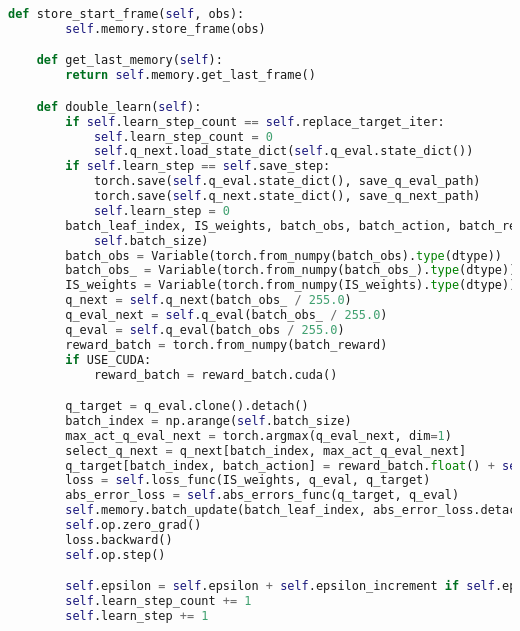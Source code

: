 \begin{lstlisting}[language={python}]
    def store_start_frame(self, obs):
        self.memory.store_frame(obs)

    def get_last_memory(self):
        return self.memory.get_last_frame()

    def double_learn(self):
        if self.learn_step_count == self.replace_target_iter:
            self.learn_step_count = 0
            self.q_next.load_state_dict(self.q_eval.state_dict())
        if self.learn_step == self.save_step:
            torch.save(self.q_eval.state_dict(), save_q_eval_path)
            torch.save(self.q_next.state_dict(), save_q_next_path)
            self.learn_step = 0
        batch_leaf_index, IS_weights, batch_obs, batch_action, batch_reward, batch_obs_ = self.memory.get_memory(
            self.batch_size)
        batch_obs = Variable(torch.from_numpy(batch_obs).type(dtype))
        batch_obs_ = Variable(torch.from_numpy(batch_obs_).type(dtype))
        IS_weights = Variable(torch.from_numpy(IS_weights).type(dtype))
        q_next = self.q_next(batch_obs_ / 255.0)
        q_eval_next = self.q_eval(batch_obs_ / 255.0)
        q_eval = self.q_eval(batch_obs / 255.0)
        reward_batch = torch.from_numpy(batch_reward)
        if USE_CUDA:
            reward_batch = reward_batch.cuda()

        q_target = q_eval.clone().detach()
        batch_index = np.arange(self.batch_size)
        max_act_q_eval_next = torch.argmax(q_eval_next, dim=1)
        select_q_next = q_next[batch_index, max_act_q_eval_next]
        q_target[batch_index, batch_action] = reward_batch.float() + self.gamma * select_q_next
        loss = self.loss_func(IS_weights, q_eval, q_target)
        abs_error_loss = self.abs_errors_func(q_target, q_eval)
        self.memory.batch_update(batch_leaf_index, abs_error_loss.detach().cpu())
        self.op.zero_grad()
        loss.backward()
        self.op.step()

        self.epsilon = self.epsilon + self.epsilon_increment if self.epsilon < self.epsilon_max else self.epsilon_max
        self.learn_step_count += 1
        self.learn_step += 1
    
\end{lstlisting}

